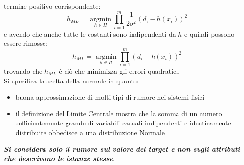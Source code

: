 termine positivo corrispondente:
\[h_{ML}=\operatorname*{argmin}_{h\in
    H}\prod_{i=1}^m \frac{1}{2\sigma^2}(d_i-h(x_i))^2\]
e avendo che anche tutte le costanti sono indipendenti da $h$ e quindi possono
essere rimosse:
\[h_{ML}=\operatorname*{argmin}_{h\in H}\prod_{i=1}^m (d_i-h(x_i))^2\]
trovando che $h_{ML}$ è ciò che minimizza gli errori quadratici. \\
Si specifica la scelta della normale in quanto:
\begin{itemize}
  \item buona approssimazione di molti tipi di rumore nei sistemi fisici 
  \item il definizione del Limite Centrale mostra che la somma di un numero
  sufficientemente grande di variabili casuali indipendenti e identicamente
  distribuite obbedisce a una distribuzione Normale 
\end{itemize}
\textbf{\textit{Si considera solo il rumore sul valore del target e non sugli
    attributi che descrivono le istanze stesse}}.
  
